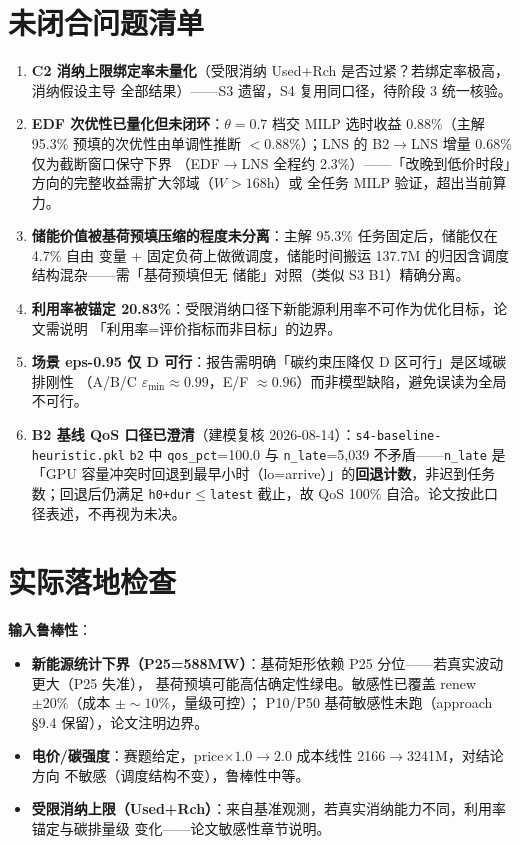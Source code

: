 \documentclass{internal-report}
\begin{document}
\section{未闭合问题清单}
\label{sec:open}

\begingroup\sloppy
\begin{enumerate}
  \item \textbf{C2 消纳上限绑定率未量化}（受限消纳 Used+Rch 是否过紧？若绑定率极高，消纳假设主导
        全部结果）——S3 遗留，S4 复用同口径，待阶段 3 统一核验。
  \item \textbf{EDF 次优性已量化但未闭环}：$\theta{=}0.7$ 档交 MILP 选时收益 0.88\%（主解 95.3\%
        预填的次优性由单调性推断 $<0.88\%$）；LNS 的 B2$\to$LNS 增量 0.68\% 仅为截断窗口保守下界
        （EDF$\to$LNS 全程约 2.3\%）——「改晚到低价时段」方向的完整收益需扩大邻域（$W>168$h）或
        全任务 MILP 验证，超出当前算力。
  \item \textbf{储能价值被基荷预填压缩的程度未分离}：主解 95.3\% 任务固定后，储能仅在 4.7\% 自由
        变量 + 固定负荷上做微调度，储能时间搬运 137.7M 的归因含调度结构混杂——需「基荷预填但无
        储能」对照（类似 S3 B1）精确分离。
  \item \textbf{利用率被锚定 20.83\%}：受限消纳口径下新能源利用率不可作为优化目标，论文需说明
        「利用率=评价指标而非目标」的边界。
  \item \textbf{场景 eps-0.95 仅 D 可行}：报告需明确「碳约束压降仅 D 区可行」是区域碳排刚性
        （A/B/C $\varepsilon_{\min}\approx0.99$，E/F $\approx0.96$）而非模型缺陷，避免误读为全局
        不可行。
  \item \textbf{B2 基线 QoS 口径已澄清}（建模复核 2026-08-14）：\texttt{s4-baseline-heuristic.pkl}
        \texttt{b2} 中 \texttt{qos\_pct}=100.0 与 \texttt{n\_late}=5{,}039 不矛盾——\texttt{n\_late}
        是「GPU 容量冲突时回退到最早小时（lo=arrive）」的\textbf{回退计数}，非迟到任务数；回退后仍满足
        \texttt{h0+dur$\le$latest} 截止，故 QoS 100\% 自洽。论文按此口径表述，不再视为未决。
\end{enumerate}
\endgroup

\section{实际落地检查}
\label{sec:deploy}

\textbf{输入鲁棒性}：
\begin{itemize}
  \item \textbf{新能源统计下界（P25=588MW）}：基荷矩形依赖 P25 分位——若真实波动更大（P25 失准），
        基荷预填可能高估确定性绿电。敏感性已覆盖 renew$\pm20\%$（成本 $\pm\sim10\%$，量级可控）；
        P10/P50 基荷敏感性未跑（approach §9.4 保留），论文注明边界。
  \item \textbf{电价/碳强度}：赛题给定，price$\times1.0\to2.0$ 成本线性 2166$\to$3241M，对结论方向
        不敏感（调度结构不变），鲁棒性中等。
  \item \textbf{受限消纳上限（Used+Rch）}：来自基准观测，若真实消纳能力不同，利用率锚定与碳排量级
        变化——论文敏感性章节说明。
\end{itemize}
\end{document}
